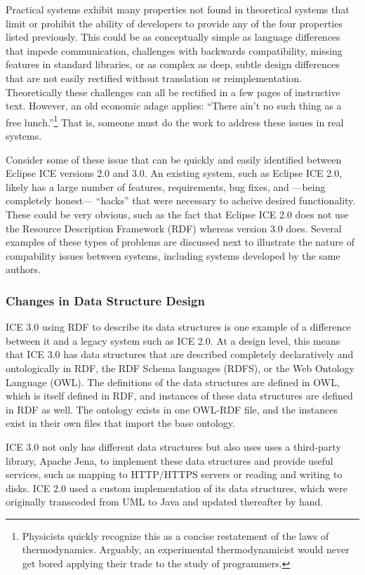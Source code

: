 Practical systems exhibit many properties not found in theoretical systems that
limit or prohibit the ability of developers to provide any of the four
properties listed previously. This could be as conceptually simple as language
differences that impede communication, challenges with backwards compatibility,
missing features in standard libraries, or as complex as deep, subtle design
differences that are not easily rectified without translation or
reimplementation. Theoretically these challenges can all be rectified in a few
pages of instructive text. However, an old economic adage applies:
``There ain't no such thing as a free lunch.''\footnote{Physicists quickly recognize this as a concise
restatement of the laws of thermodynamics. Arguably, an experimental
thermodynamicist would never get bored applying their trade to the study of
programmers.} That is, someone must do the work to address these issues in real
systems.

Consider some of these issue that can be quickly and easily identified between
Eclipse ICE versions 2.0 and 3.0. An existing system, such as Eclipse ICE 2.0,
likely has a large number of features, requirements, bug fixes, and ---being completely
honest--- ``hacks'' that were necessary to acheive desired functionality. These
could be very obvious, such as the fact that Eclipse ICE 2.0 does not use the Resource
Description Framework (RDF) whereas version 3.0 does. Several examples of these
types of problems are discussed next to illustrate the nature of
compability issues between systems, including systems developed by the same authors.

\subsubsection{Changes in Data Structure Design}
\label{ice-data}

ICE 3.0 using RDF to describe its data structures is one example of a
difference between it and a legacy system such as ICE 2.0. At a design level,
this means that ICE 3.0 has data structures that are described completely
declaratively and ontologically in RDF, the RDF Schema languages (RDFS), or the
Web Ontology Language (OWL). The definitions of the data structures are defined
in OWL, which is itself defined in RDF, and instances of these data structures
are defined in RDF as well. The ontology exists in one OWL-RDF file, and the
instances exist in their own files that import the base ontology.

ICE 3.0 not only has different data structures but also uses uses a third-party
library, Apache Jena, to implement these data structures and provide useful
services, such as mapping to HTTP/HTTPS servers or reading and writing to
disks. ICE 2.0 used a custom implementation of its data structures, which were
originally transcoded from UML to Java and updated thereafter by hand.

